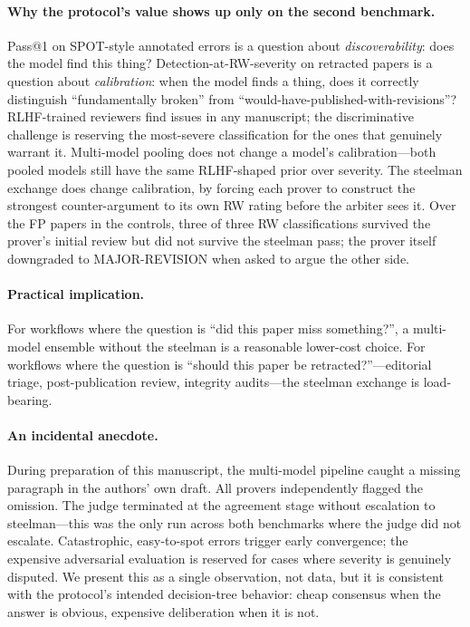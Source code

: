 \documentclass[11pt]{article}
\theoremstyle{definition}
\begin{document}
\paragraph{Why the protocol's value shows up only on the second benchmark.} Pass@1 on SPOT-style annotated errors is a question about \emph{discoverability}: does the model find this thing? Detection-at-RW-severity on retracted papers is a question about \emph{calibration}: when the model finds a thing, does it correctly distinguish ``fundamentally broken'' from ``would-have-published-with-revisions''? RLHF-trained reviewers find issues in any manuscript; the discriminative challenge is reserving the most-severe classification for the ones that genuinely warrant it. Multi-model pooling does not change a model's calibration---both pooled models still have the same RLHF-shaped prior over severity. The steelman exchange does change calibration, by forcing each prover to construct the strongest counter-argument to its own RW rating before the arbiter sees it. Over the FP papers in the controls, three of three RW classifications survived the prover's initial review but did not survive the steelman pass; the prover itself downgraded to MAJOR-REVISION when asked to argue the other side.

\paragraph{Practical implication.} For workflows where the question is ``did this paper miss something?'', a multi-model ensemble without the steelman is a reasonable lower-cost choice. For workflows where the question is ``should this paper be retracted?''---editorial triage, post-publication review, integrity audits---the steelman exchange is load-bearing.

\paragraph{An incidental anecdote.} During preparation of this manuscript, the multi-model pipeline caught a missing paragraph in the authors' own draft. All provers independently flagged the omission. The judge terminated at the agreement stage without escalation to steelman---this was the only run across both benchmarks where the judge did not escalate. Catastrophic, easy-to-spot errors trigger early convergence; the expensive adversarial evaluation is reserved for cases where severity is genuinely disputed. We present this as a single observation, not data, but it is consistent with the protocol's intended decision-tree behavior: cheap consensus when the answer is obvious, expensive deliberation when it is not.
\end{document}
